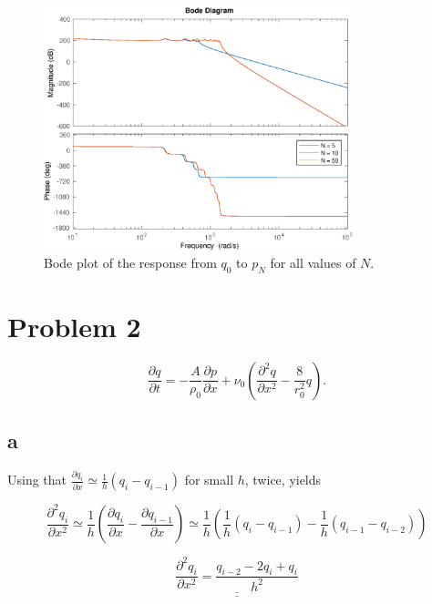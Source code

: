 \documentclass{article}
\begin{document}
\begin{figure}[H]
    \centering
    \includegraphics[width = 0.8\textwidth]{ex7_1c_bode_pN}
    \caption{Bode plot of the response from $q_0$ to $p_N$ for all values of $N$.}
    \label{fig:1c_bode_pN}
\end{figure}

\section{Problem 2}

\begin{equation}\label{eq:linfricdiff}
    \frac{\partial q}{\partial t} = -\frac{A}{\rho_0} \frac{\partial p}{\partial x} + \nu_0(\frac{\partial^2 q}{\partial x^2} - \frac{8}{r_0^2}q).
\end{equation}

\subsection{a}

Using that $\frac{\partial q_i}{\partial x} \simeq \frac{1}{h}(q_i - q_{i-1})$ for small $h$, twice, yields

\begin{equation*}
    \frac{\partial^2 q_i}{\partial x^2} \simeq \frac{1}{h}(\frac{\partial q_i}{\partial x} - \frac{\partial q_{i-1}}{\partial x}) \simeq \frac{1}{h}(\frac{1}{h}(q_i - q_{i-1}) - \frac{1}{h}(q_{i-1} - q_{i-2}))
\end{equation*}

\begin{equation*}
    \underline{\underline{\frac{\partial^2 q_i}{\partial x^2} = \frac{q_{i-2} - 2q_i + q_i}{h^2}}}
\end{equation*}
\end{document}
